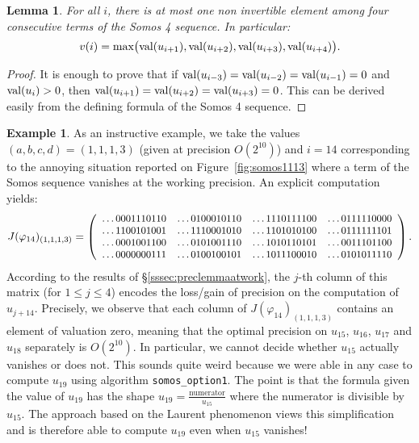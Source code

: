 \documentclass[11pt]{article}
\numberwithin{equation}{section}
\numberwithin{figure}{section}
\renewcommand{\leq}{\leqslant}
\newtheorem{lem}[theo]{Lemma}
\theoremstyle{definition}
\newtheorem*{ex*}{Example}
\renewcommand{\max}{\text{\rm max}}
\newcommand{\val}{\text{\rm val}}
\begin{document}
\begin{lem}
\label{lem:somosvi}
For all $i$, there is at most one non invertible element among four
consecutive terms of the Somos 4 sequence.
In particular:
$$v(i) = \max\big(\val(u_{i+1}), \val(u_{i+2}), \val(u_{i+3}),
\val(u_{i+4})\big).$$
\end{lem}

\begin{proof}
It is enough to prove that if $\val(u_{i-3}) = \val(u_{i-2}) = 
\val(u_{i-1}) = 0$ and $\val(u_i) > 0$, then $\val(u_{i+1}) = 
\val(u_{i+2}) = \val(u_{i+3}) = 0$. This can be derived easily from
the defining formula of the Somos 4 sequence.
\end{proof}

\begin{ex*}
As an instructive example, we take the values $(a,b,c,d) = 
(1,1,1,3)$ (given at precision $O(2^{10})$) and $i = 14$ corresponding 
to the annoying situation reported on Figure~\ref{fig:somos1113} where a 
term of the Somos sequence vanishes at the working precision.
An explicit computation yields:
$$\small J(\varphi_{14})_{(1,1,1,3)} = 
\left(\begin{array}{rrrr}
\ldots0001110110 & \ldots0100010110 & \ldots1110111100 & \ldots0111110000 \\
\ldots1100101001 & \ldots1110001010 & \ldots1101010100 & \ldots0111111101 \\
\ldots0001001100 & \ldots0101001110 & \ldots1010110101 & \ldots0011101100 \\
\ldots0000000111 & \ldots0100100101 & \ldots1011100010 & \ldots0101011110
\end{array}\right).$$
According to the results of \S \ref{sssec:preclemmaatwork}, the $j$-th 
column of this matrix (for $1 \leq j \leq 4$) encodes the loss/gain of
precision on the computation of $u_{j+14}$. Precisely, we observe that
each column of $J(\varphi_{14})_{(1,1,1,3)}$ contains an element of 
valuation zero, meaning that the optimal precision on $u_{15}$, 
$u_{16}$, $u_{17}$ and $u_{18}$ separately is $O(2^{10})$. In 
particular, we cannot decide whether $u_{15}$ actually vanishes or 
does not. This sounds quite weird because we were able in any case to 
compute $u_{19}$ using algorithm \texttt{somos\_option1}. The point is 
that the formula given the value of $u_{19}$ has the shape $u_{19} = 
\frac{\text{numerator}}{u_{15}}$ where the numerator is divisible by 
$u_{15}$. The approach based on the Laurent phenomenon views this
simplification and is therefore able to compute $u_{19}$ even when
$u_{15}$ vanishes!


\end{ex*}
\end{document}
